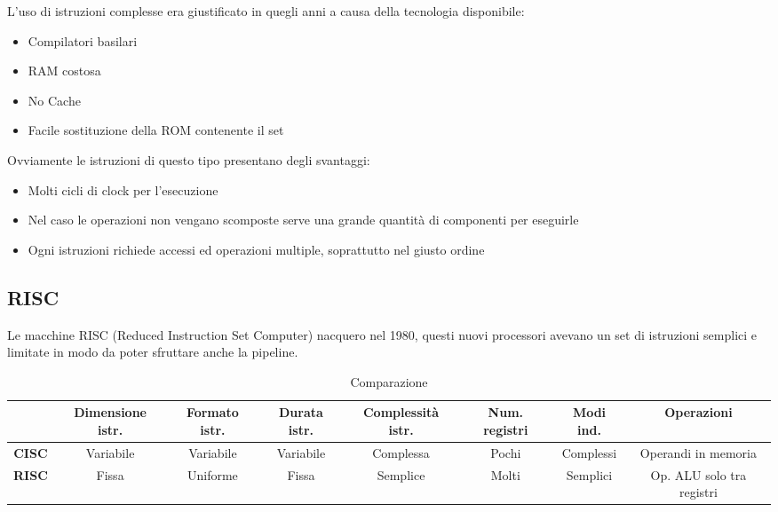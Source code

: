 \documentclass{article}
\begin{document}
\noindent L'uso di istruzioni complesse era giustificato in quegli anni a causa della tecnologia disponibile:
\begin{itemize}
    \item Compilatori basilari 
    \item RAM costosa 
    \item No Cache
    \item Facile sostituzione della ROM contenente il set\newline
\end{itemize}

\noindent Ovviamente le istruzioni di questo tipo presentano degli svantaggi:
\begin{itemize}
    \item Molti cicli di clock per l'esecuzione
    \item Nel caso le operazioni non vengano scomposte serve una grande quantità di componenti per eseguirle
    \item Ogni istruzioni richiede accessi ed operazioni multiple, soprattutto nel giusto ordine
\end{itemize}

\subsection{RISC}

Le macchine RISC (Reduced Instruction Set Computer) nacquero nel 1980, questi nuovi processori avevano un set di istruzioni semplici e limitate in modo da poter sfruttare anche la pipeline.\newline


\begin{table}[H]
    \centering
    \begin{adjustwidth}{-4.25cm}{}
    \begin{tabular}{c|c|c|c|c|c|c|c}
         & Dimensione istr. & Formato istr. & Durata istr. & Complessità istr. & Num. registri & Modi ind. & Operazioni\\
         \hline
         \textbf{CISC} & Variabile & Variabile & Variabile & Complessa & Pochi & Complessi & Operandi in memoria\\
         \hline
         \textbf{RISC} & Fissa & Uniforme & Fissa & Semplice & Molti & Semplici & Op. ALU solo tra registri \\
    \end{tabular}
    \caption{Comparazione}
    \end{adjustwidth}
    \label{tab:cisc/risc}
\end{table}
\end{document}

